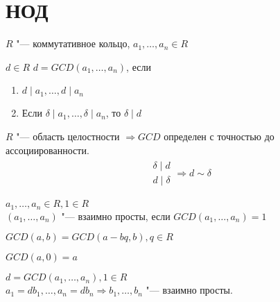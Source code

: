 \section{НОД}

$R$ "--- коммутативное кольцо, $a_{1}, \dots, a_{n} \in R$
\begin{Def}
	$d \in R$ $d = GCD\left(a_{1}, \dots, a_{n}\right)$, если 
	\begin{enumerate}
		\item $d \mid a_{1}, \dots, d \mid a_{n}$
		\item Если $\delta \mid a_{1}, \dots, \delta \mid a_{n}$, то $\delta \mid d$
	\end{enumerate}
\end{Def}

\begin{Rem}
	$R$ "--- область целостности $\Rightarrow GCD$ определен с точностью до ассоциированности. 
	\begin{gather*}
		\begin{array}{c}
			\delta \mid d \\
			d \mid \delta
		\end{array}
		\Rightarrow d \sim \delta
	\end{gather*}
\end{Rem}

\begin{Def}
	$a_{1}, \dots, a_{n} \in R, 1 \in R$ \\
	$\left(a_{1}, \dots, a_{n}\right)$ "--- взаимно просты, если $GCD\left(a_{1}, \dots, a_{n}\right) = 1$
\end{Def}

\begin{conseq}
	$GCD\left(a, b\right) = GCD\left(a - bq, b\right), q \in R$
\end{conseq}
\begin{conseq}
	$GCD\left(a, 0\right) = a$
\end{conseq}
\begin{conseq}
	$d = GCD\left(a_{1}, \dots, a_{n}\right), 1 \in R $ \\
	$a_{1} = db_{1}, \dots, a_{n} = db_{n} \Rightarrow b_{1}, \dots, b_{n}$ "--- взаимно просты.
\end{conseq}

